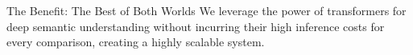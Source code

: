 \documentclass[aspectratio=169,10pt]{beamer}
\begin{document}
\begin{frame}
    \vspace{0.5em}
    
    \centering
    \begin{minipage}{0.95\textwidth}
        \begin{alertblock}{The Benefit: The Best of Both Worlds}
            We leverage the power of transformers for deep semantic understanding without incurring their high inference costs for every comparison, creating a highly scalable system.
        \end{alertblock}
    \end{minipage}
    
    
    
\end{frame}


    

    
\end{document}
